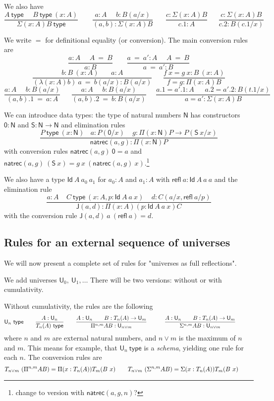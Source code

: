 \documentclass[10pt,a4paper]{article}
\newcommand{\refl}{\mathsf{refl}}
\newcommand{\Id}{\mathsf{Id}}
\newcommand{\conv}{=}
\def\NN{\mathsf{N}}
\def\UU{\mathsf{U}}
\def\JJ{\mathsf{J}}
\def\ZERO{\mathsf{0}}
\def\SUCC{\mathsf{S}}
\newcommand{\type}{\mathsf{type}}
\newcommand{\T}{\mathsf{T}}
\newcommand{\natrec}{\mathsf{natrec}}
\begin{document}
We also have
$$
\frac{A~\type~~~~~~B~\type~(x:A)}{\Sigma (x:A) B~\type}~~~~~~~~~
\frac{a:A~~~~~~b:B(a/x)}{(a,b):\Sigma (x:A) B}~~~~~~~~
\frac{c:\Sigma (x:A) B}{c.1:A}~~~~~~~
\frac{c:\Sigma (x:A) B}{c.2:B(c.1/x)}
$$

We write $\conv$ for definitional equality (or conversion). The main conversion rules are 
$$
\frac{ a:A~~~~~~ A~ \conv~ B}{ a:B}~~~~~~~~~
\frac{ a ~\conv~a':A~~~~~~ A  ~\conv~ B}{ a ~\conv~a':B}
$$
$$
\frac{b:B~(x:A)~~~~~~~~ a:A}{ (\lambda (x:A)b)~a  ~\conv~ b(a/x):B(a/x)}
~~~~~~~
\frac{f~x = g~x:B~(x:A)}{ f = g : \Pi (x:A)B}
$$
$$
\frac{ a:A~~~~~~ b:B(a/x)}{ (a,b).1  ~\conv~ a:A}
~~~~~~~
\frac{ a:A~~~~~~ b:B(a/x)}{ (a,b).2  ~\conv~ b:B(a/x)}~~~~~~
\frac{ a.1 = a'.1:A~~~~~~~ a.2 = a'.2:B(t.1/x)}{ a = a' : \Sigma (x:A)B}
$$

We can introduce data types: the type of natural numbers $\NN$ has
constructors $\ZERO:\NN$ and $\SUCC:\NN\rightarrow\NN$ and elimination rules
$$
\frac{P~\type~(x:\NN)~~~~a:P(\ZERO/x)~~~~~g:\Pi (x:\NN)P\rightarrow P(\SUCC~x/x)}{\natrec(a,g):\Pi (x:\NN)P}
$$
with conversion rules $\natrec(a,g)~\ZERO = a$ and $\natrec(a,g)~(\SUCC~x) = g~x~(\natrec(a,g)~x)$.\footnote{change to version with $\natrec(a,g,n)$?}

We also have a type $\Id~A~a_0~a_1$ for $a_0:A$ and $a_1:A$ with $\refl~a:\Id~A~a~a$
and the elimination rule
$$\frac{a:A~~~~~C~\type~(x:A,p:\Id~A~a~x)~~~~~d:C(a/x,\refl~a/p)}{\JJ (a,d):\Pi (x:A)(p:\Id~A~a~x)C}$$
with the conversion rule $\JJ(a,d)~a~(\refl~a) = d$.

\subsection*{Rules for an external sequence of universes}

We will now present a complete set of rules for "universes as full reflections".

We add universes $\UU_0,~\UU_1,\dots$ There will be two versions: without or with
cumulativity.

Without cumulativity, the rules are the following
$$
\UU_n~\type~~~~~~
\frac{A:\UU_{n}}{\\T_{n}(A)~\type}~~~~~~
\frac{A:\UU_{n}~~~~~~B:\\T_{n}(A)\rightarrow \UU_{m}}
     {\Pi^{n,m} A B:\UU_{n\vee m}}~~~~~~~~~
\frac{A:\UU_{n}~~~~~~B:\\T_{n}(A)\rightarrow \UU_{m}}
     {\Sigma^{n,m} A B:\UU_{n\vee m}}~~~~~~~~~
$$
where $n$ and $m$ are external natural numbers, and $n \vee m$ is the maximum of $n$ and $m$. This means for example, that $\UU_n~\type$ is a {\em schema}, yielding one rule for each $n$.
The conversion rules are
$$
\\T_{n\vee m}~(\Pi^{n,m} A B) = \Pi (x:\\T_{n}(A)) \\T_{m}(B~x)~~~~~~~
\\T_{n\vee m}~(\Sigma^{n,m} A B) = \Sigma (x:\\T_{n}(A)) \\T_{m}(B~x)~~~~~~~
$$
\end{document}
